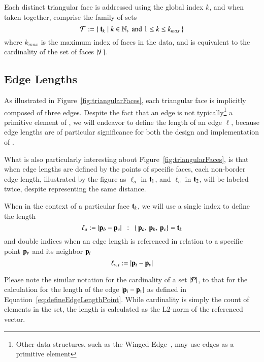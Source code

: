 Each distinct triangular face is addressed using the global index $k$, and when taken together, comprise the family of sets
%
\begin{equation}
	\mathcal{T} := \left \{\:\mathbf{t}_k \mid k \in \mathbb{N}, \;\text{and}\; 1\leq k \leq k_{max}\:\right \}
	\label{eq:defineSetOfFaces}
\end{equation}
%
where $k_{max}$ is the maximum index of faces in the data, and is equivalent to the cardinality of the set of faces $|\mathcal{T}|$.%
%
%

%
%
%
\subsection{Edge Lengths}
\label{ch2s3ssEL}
As illustrated in Figure~\ref{fig:triangularFaces}, each triangular face is implicitly composed of three edges. Despite the fact that an edge is not typically\footnote{Other data structures, such as the Winged-Edge~\cite[p.~1]{Baumgart75}, may use edges as a primitive element} a primitive element of \tdd{}, we will endeavor to define the length of an edge $\ell$, because edge lengths are of particular significance for both the design and implementation of .

What is also particularly interesting about Figure~\ref{fig:triangularFaces}, is that when edge lengths are defined by the points of specific faces, each non-border edge length, illustrated by the figure as $\ell_a$ in $\mathbf{t}_1$, and $\ell_c$ in $\mathbf{t}_2$, will be labeled twice, despite representing the same distance.

When in the context of a particular face $\mathbf{t}_k$, we will use a single index to define the length
%
\begin{equation}
	\ell_a := |\mathbf{p}_b - \mathbf{p}_c| \enspace:\enspace \left \{\,\mathbf{p}_a,\,\mathbf{p}_b,\,\mathbf{p}_c\right \} = \mathbf{t}_k
	\label{eq:defineEdgeLengthFace}
\end{equation}%
%
%
and double indices when an edge length is referenced in relation to a specific point $\mathbf{p}_v$ and its neighbor $\mathbf{p}_i$
%
\begin{equation}
	\ell_{v,\kern.75pt i} := |\mathbf{p}_i - \mathbf{p}_v|
	\label{eq:defineEdgeLengthPoint}
\end{equation}%
%

Please note the similar notation for the cardinality of a set $|\mathcal{P}|$, to that for the calculation for the length of the edge $|\mathbf{p}_i - \mathbf{p}_v|$ as defined in Equation~\ref{eq:defineEdgeLengthPoint}. While cardinality is simply the count of elements in the set, the length is calculated as the L2-norm of the referenced vector.~\cite[p.~26]{Mara12}

